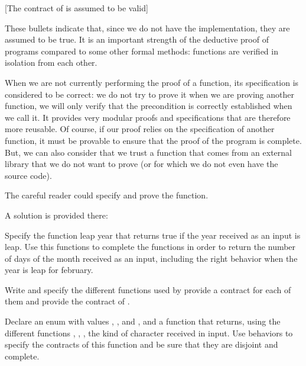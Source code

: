 [The contract of  is assumed to be valid]


These bullets indicate that, since we do not have the implementation,
they are assumed to be true. It is an important strength of the
deductive proof of programs compared to some other formal methods:
functions are verified in isolation from each other.

When we are not currently performing the proof of a function, its
specification is considered to be correct: we do not try to prove it
when we are proving another function, we will only verify that the
precondition is correctly established when we call it. It provides very
modular proofs and specifications that are therefore more reusable. Of
course, if our proof relies on the specification of another function, it
must be provable to ensure that the proof of the program is complete.
But, we can also consider that we trust a function that comes from an
external library that we do not want to prove (or for which we do not
even have the source code).

The careful reader could specify and prove the 
function.

A solution is provided there:










Specify the function leap year that returns true if the year received
as an input is leap. Use this functions to complete the functions
 in order to return the number of days of the
month received as an input, including the right behavior when the year
is leap for february.







Write and specify the different functions used by
 provide a contract for each of them and
provide the contract of .





Declare an enum with values , ,
 and , and a function
 that returns, using the different
functions , ,
, the kind of character received in input. Use
behaviors to specify the contracts of this function and be sure that
they are disjoint and complete.




